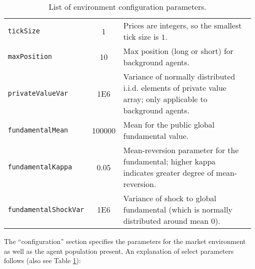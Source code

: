 \documentclass[11pt]{article}
\begin{document}
\begin{table}
\begin{tabular}[f]{p{} c p{}}
\texttt{tickSize} 		& 1 & Prices are integers, so the smallest tick size is $1$. \\

\texttt{maxPosition} 	& 10 & Max position (long or short) for background agents. \\
\texttt{privateValueVar} & 1E6 & Variance of normally distributed i.i.d. elements of private value array; only applicable to background agents. \\
\texttt{fundamentalMean} 	& 100000 & Mean for the public global fundamental value.\\
\texttt{fundamentalKappa} 		& 0.05 & Mean-reversion parameter for the fundamental; higher kappa indicates greater degree of mean-reversion.\\
\texttt{fundamentalShockVar} 		& 1E6 & Variance of shock to global fundamental (which is normally distributed around mean 0).\\


\end{tabular}
\caption{List of environment configuration parameters.}
\label{tab:configs}
\end{table}

The ``configuration'' section specifies the parameters for the market environment as well as the agent population present.
%
An explanation of select parameters follows (also see Table \ref{tab:configs}):
\end{document}
